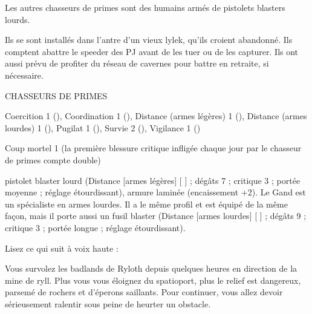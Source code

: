 \documentclass[a4paper,10pt,twoside,twocolumn,openany]{book}
\begin{document}
Les autres chasseurs de primes sont des humains armés de pistolets blasters lourds.

Ils se sont installés dans l’antre d’un vieux lylek, qu’ils
croient abandonné. Ils comptent abattre le speeder des
PJ avant de les tuer ou de les capturer. Ils ont aussi prévu
de profiter du réseau de cavernes pour battre en retraite,
si nécessaire.

\begin{monsterbox}{CHASSEURS DE PRIMES}

  \stats[VIG=3,AGI=3,INT=2,RUS=3,VOL=2,PRE=2]
  \hline%

  \basics[encaissement=5,blessure=13]

  \hline%

\begin{monsteraction}[Compétences]
Coercition 1 (\ability \proficiency), Coordination
1 (\ability \ability \proficiency), Distance (armes légères) 1 (\ability \ability \proficiency),
Distance (armes lourdes) 1 (\ability \ability \proficiency), Pugilat 1
(\ability \ability \proficiency), Survie 2 (\ability \ability \proficiency), Vigilance 1 (\ability \proficiency)
\end{monsteraction}

\begin{monsteraction}[Talents]
Coup mortel 1 (la première blessure critique infligée chaque jour par le chasseur de primes
compte double)
\end{monsteraction}

  \begin{monsteraction}[Équipement]
pistolet blaster lourd (Distance
[armes légères] [ \ability \ability \proficiency ] ; dégâts 7 ; critique 3 ;
portée moyenne ; réglage étourdissant), armure laminée (encaissement +2).
Le Gand est un spécialiste en armes lourdes. Il a
le même profil et est équipé de la même façon,
mais il porte aussi un fusil blaster (Distance [armes
lourdes] [ \ability \ability \proficiency ] ; dégâts 9 ; critique 3 ; portée
longue ; réglage étourdissant).
  \end{monsteraction}

\end{monsterbox}


Lisez ce qui suit à voix haute :

\begin{quotebox}
    
Vous survolez les badlands de Ryloth depuis
quelques heures en direction de la mine de ryll.
Plus vous vous éloignez du spatioport, plus le relief
est dangereux, parsemé de rochers et d’éperons
saillants. Pour continuer, vous allez devoir sérieusement ralentir sous peine de heurter un obstacle.
\end{quotebox}
\end{document}
